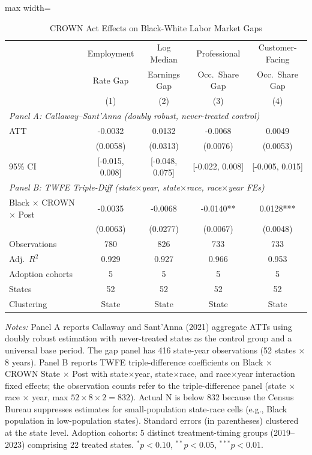 \begin{table}[htbp]
\centering
\caption{CROWN Act Effects on Black-White Labor Market Gaps}
\label{tab:main_results}
\begin{adjustbox}{max width=\textwidth}
\begin{tabular}{lcccc}
\toprule
 & Employment & Log Median & Professional & Customer-Facing \\
 & Rate Gap & Earnings Gap & Occ.\ Share Gap & Occ.\ Share Gap \\
 & (1) & (2) & (3) & (4) \\
\midrule
\multicolumn{5}{l}{\textit{Panel A: Callaway--Sant'Anna (doubly robust, never-treated control)}} \\
ATT & -0.0032 & 0.0132 & -0.0068 & 0.0049 \\
 & (0.0058) & (0.0313) & (0.0076) & (0.0053) \\
95\% CI & [-0.015, 0.008] & [-0.048, 0.075] & [-0.022, 0.008] & [-0.005, 0.015] \\
\midrule
\multicolumn{5}{l}{\textit{Panel B: TWFE Triple-Diff (state$\times$year, state$\times$race, race$\times$year FEs)}} \\
Black $\times$ CROWN $\times$ Post & -0.0035 & -0.0068 & -0.0140** & 0.0128*** \\
 & (0.0063) & (0.0277) & (0.0067) & (0.0048) \\
\midrule
Observations & 780 & 826 & 733 & 733 \\
Adj.\ $R^2$ & 0.929 & 0.927 & 0.966 & 0.953 \\
Adoption cohorts & 5 & 5 & 5 & 5 \\
States & 52 & 52 & 52 & 52 \\
Clustering & State & State & State & State \\
\bottomrule
\end{tabular}
\end{adjustbox}
\begin{tablenotes}[flushleft]
\small
\item \textit{Notes:} Panel A reports Callaway and Sant'Anna (2021) aggregate ATTs using doubly robust estimation with never-treated states as the control group and a universal base period. The gap panel has 416 state-year observations (52 states $\times$ 8 years). Panel B reports TWFE triple-difference coefficients on Black $\times$ CROWN State $\times$ Post with state$\times$year, state$\times$race, and race$\times$year interaction fixed effects; the observation counts refer to the triple-difference panel (state $\times$ race $\times$ year, max $52 \times 8 \times 2 = 832$). Actual N is below 832 because the Census Bureau suppresses estimates for small-population state-race cells (e.g., Black population in low-population states). Standard errors (in parentheses) clustered at the state level. Adoption cohorts: 5 distinct treatment-timing groups (2019--2023) comprising 22 treated states. $^{*}p<0.10$, $^{**}p<0.05$, $^{***}p<0.01$.
\end{tablenotes}
\end{table}
